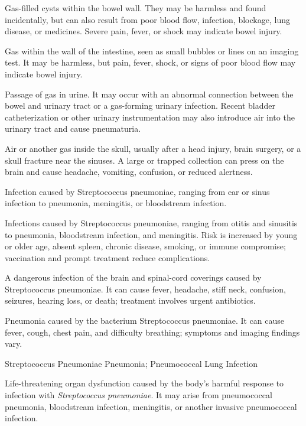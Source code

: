  Gas-filled cysts within the bowel wall. They may be harmless and found incidentally, but can also result from poor blood flow, infection, blockage, lung disease, or medicines. Severe pain, fever, or shock may indicate bowel injury.

 Gas within the wall of the intestine, seen as small bubbles or lines on an imaging test. It may be harmless, but pain, fever, shock, or signs of poor blood flow may indicate bowel injury.

 Passage of gas in urine. It may occur with an abnormal connection
between the bowel and urinary tract or a gas-forming urinary infection. Recent bladder
catheterization or other urinary instrumentation may also introduce air into the urinary
tract and cause pneumaturia.

 Air or another gas inside the skull, usually after a head injury, brain surgery, or a skull fracture near the sinuses. A large or trapped collection can press on the brain and cause headache, vomiting, confusion, or reduced alertness.

 Infection caused by Streptococcus pneumoniae, ranging from ear or sinus infection to pneumonia, meningitis, or bloodstream infection.

 Infections caused by Streptococcus pneumoniae, ranging from otitis and sinusitis to pneumonia, bloodstream infection, and meningitis. Risk is increased by young or older age, absent spleen, chronic disease, smoking, or immune compromise; vaccination and prompt treatment reduce complications.

 A dangerous infection of the brain and spinal-cord coverings caused by Streptococcus pneumoniae. It can cause fever, headache, stiff neck, confusion, seizures, hearing loss, or death; treatment involves urgent antibiotics.

 Pneumonia caused by the bacterium Streptococcus pneumoniae. It can cause fever, cough, chest pain, and difficulty breathing; symptoms and imaging findings vary.

\synonyms
Streptococcus Pneumoniae Pneumonia; Pneumococcal Lung Infection

 Life-threatening organ dysfunction caused by the body’s harmful response to infection with \textit{Streptococcus pneumoniae}. It may arise from pneumococcal pneumonia, bloodstream infection, meningitis, or another invasive pneumococcal infection.

